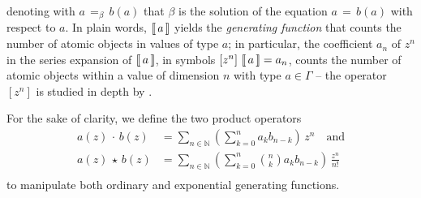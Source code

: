 denoting with $a\,=_{\beta}\,b(a)$ that $\beta$ is the solution of the equation
$a\,=\,b(a)$ with respect to $a$. In plain words, $\left\llbracket\,a\,\right\rrbracket$ yields  the
\textit{generating function} that counts the number of atomic objects in values
of type $a$; in particular, the coefficient $a_{n}$ of $z^{n}$ in the series
expansion of $\left\llbracket\,a\,\right\rrbracket$, in symbols $[z^{n}]\,\left\llbracket\,a\,\right\rrbracket = a_{n}$, counts
the number of atomic objects within a value of dimension $n$ with type
$a\in\Gamma$ -- the operator $[z^{n}]$ is studied in depth by \citet{MSV07}.

For the sake of clarity, we define the two product operators
\begin{displaymath}
\begin{split}
    a(z)\,\cdot\,b(z) &= \sum_{n\in\mathbb{N}}{\left(\sum_{k=0}^{n}{a_{k}b_{n-k}}\right)\,z^{n}}\quad\text{and}\\
    a(z)\,\star\,b(z) &= \sum_{n\in\mathbb{N}}{\left(\sum_{k=0}^{n}{{ {n}\choose{k} }a_{k}b_{n-k}}\right)\,\frac{z^{n}}{n!}} \\
\end{split}
\end{displaymath}
to manipulate both ordinary and exponential generating functions.

